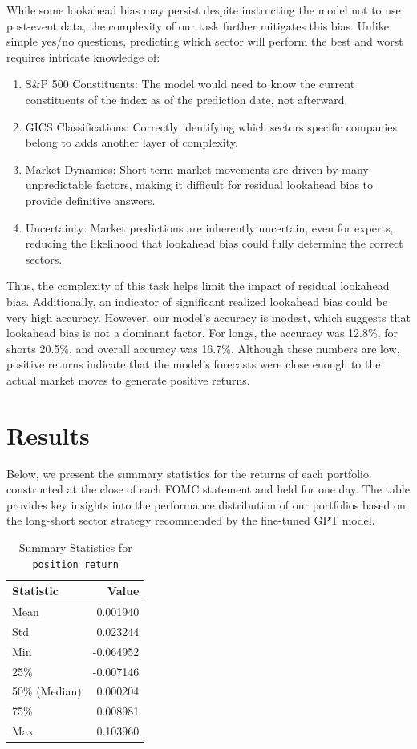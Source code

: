 \documentclass[11pt]{article}
\begin{document}
While some lookahead bias may persist despite instructing the model not to use post-event data, 
the complexity of our task further mitigates this bias. Unlike simple yes/no questions, 
predicting which sector will perform the best and worst requires intricate knowledge of:

\begin{enumerate}
    \item S\&P 500 Constituents: The model would need to know the current constituents of the index as of the prediction date, not afterward.
    \item GICS Classifications: Correctly identifying which sectors specific companies belong to adds another layer of complexity.
    \item Market Dynamics: Short-term market movements are driven by many unpredictable factors, making it difficult for residual lookahead bias to provide definitive answers.
    \item Uncertainty: Market predictions are inherently uncertain, even for experts, reducing the likelihood that lookahead bias could fully determine the correct sectors.
\end{enumerate}

Thus, the complexity of this task helps limit the impact of residual lookahead bias. Additionally, 
an indicator of significant realized lookahead bias could be very high accuracy. However, our 
model's accuracy is modest, which suggests that lookahead bias is not a dominant factor. For longs, 
the accuracy was 12.8\%, for shorts 20.5\%, and overall accuracy was 16.7\%. Although these numbers 
are low, positive returns indicate that the model's forecasts were close enough to the actual 
market moves to generate positive returns.


\section{Results}

Below, we present the summary statistics for the returns of each portfolio constructed at the close of each FOMC statement and held for one day. The table provides key insights into the performance distribution of our portfolios based on the long-short sector strategy recommended by the fine-tuned GPT model.

\begin{table}[H]
\centering
\begin{tabular}{lr}
\toprule
\textbf{Statistic} & \textbf{Value} \\
\midrule
Mean          & 0.001940       \\
Std           & 0.023244       \\
Min           & -0.064952      \\
25\%          & -0.007146      \\
50\% (Median) & 0.000204       \\
75\%          & 0.008981       \\
Max           & 0.103960       \\
\bottomrule
\end{tabular}
\caption{Summary Statistics for \texttt{position\_return}}
\end{table}
\end{document}
